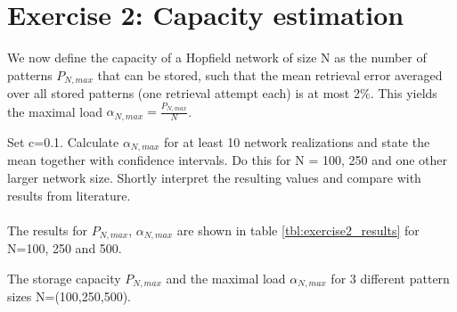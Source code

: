 	\section{Exercise 2: Capacity estimation}

\begin{itshape}
\small
We now define the capacity of a Hopfield network of size N as the number of patterns $P_{N,max}$ that can be stored, such that the mean retrieval error averaged over all stored patterns (one retrieval attempt each) is at most 2$\%$. This yields the maximal load $\alpha_{N,max} = \frac{P_{N,max} }{N}$.

Set c=0.1. Calculate $\alpha_{N,max}$ for at least 10 network realizations and state the mean together with confidence intervals. Do this for N = 100, 250 and one other larger network size. Shortly interpret the resulting values and compare with results from literature.
\end{itshape}

\paragraph*{}

The results for $P_{N,max}$, $\alpha_{N,max}$ are shown in table \ref{tbl:exercise2_results} for N=100, 250 and 500.

\begin{table}[H] 
\centering 

\label{tbl:exercise2_results}
\caption{The storage capacity $P_{N,max}$ and the maximal load $\alpha_{N,max}$ for 3 different pattern sizes N=(100,250,500).}
\end{table} 

